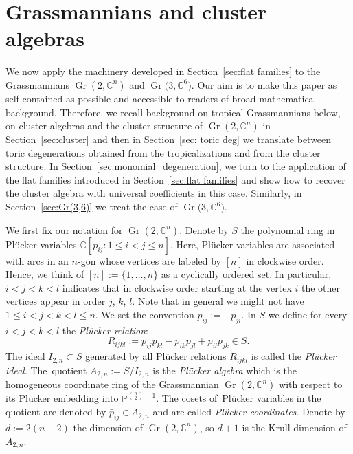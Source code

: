\documentclass[pdftex]{sigma}%
\numberwithin{equation}{section}
\DeclareMathOperator{\Gr}{Gr}
\begin{document}
\section{Grassmannians and cluster algebras}\label{sec:Gr}

We now apply the machinery developed in Section~\ref{sec:flat families} to the Grassmannians $\Gr(2,\mathbb C^n)$ and $\Gr\big(3,\mathbb C^6\big)$.
Our aim is to make this paper as self-contained as possible and accessible to readers of broad mathematical background.
Therefore, we recall background on tropical Grassmannians below, on cluster algebras and the cluster structure of $\Gr(2,\mathbb C^n)$ in Section~\ref{sec:cluster} and then in Section~\ref{sec: toric deg} we translate between toric degenerations obtained from the tropicalizations and from the cluster structure.
In Section~\ref{sec:monomial_degeneration}, we turn to the application of the flat families introduced in Section~\ref{sec:flat families} and show how to recover the cluster algebra with universal coefficients in this case.
Similarly, in Section~\ref{sec:Gr(3,6)} we treat the case of $\Gr\big(3,\mathbb C^6\big)$.



We first fix our notation for $\Gr(2,\mathbb C^n)$.
Denote by $S$ the polynomial ring in Pl\"ucker variables $\mathbb C[p_{ij}\colon 1\leq i<j\le n]$.
Here, Pl\"ucker variables are associated with arcs in an $n$-gon whose vertices are labeled by $[n]$ in clockwise order.
Hence, we think of $[n]:=\{1,\ldots,n\}$ as a cyclically ordered set. In particular, $i<j<k<l$ indicates that in clockwise order starting at the vertex $i$ the other vertices appear in order $j$, $k$, $l$.
Note that in general we might not have $1\le i<j<k<l\le n$.
We set the convention $p_{ij}:=-p_{ji}$.
In $S$ we define for every $i<j<k<l$ the {\it Pl\"ucker relation}:
\begin{displaymath}
R_{ijkl}:=p_{ij}p_{kl}-p_{ik}p_{jl}+p_{il}p_{jk}\in S.
\end{displaymath}
The ideal $I_{2,n}\subset S$ generated by all Pl\"ucker relations $R_{ijkl}$ is called the {\it Pl\"ucker ideal}. The~quo\-tient $A_{2,n}:=S/I_{2,n}$ is the {\it Pl\"ucker algebra} which is the homogeneous coordinate ring of the Grassmannian $\Gr(2,\mathbb C^n)$ with respect to its Pl\"ucker embedding into $\mathbb P^{\binom{n}{2}-1}$.
The cosets of~Pl\"u\-cker variables in the quotient are denoted by $\bar p_{ij}\in A_{2,n}$ and are called {\it Pl\"ucker coordinates}.
Denote by $d:=2(n-2)$ the dimension of $\Gr(2,\mathbb C^n)$, so $d+1$ is the Krull-dimension of $A_{2,n}$.
\end{document}
